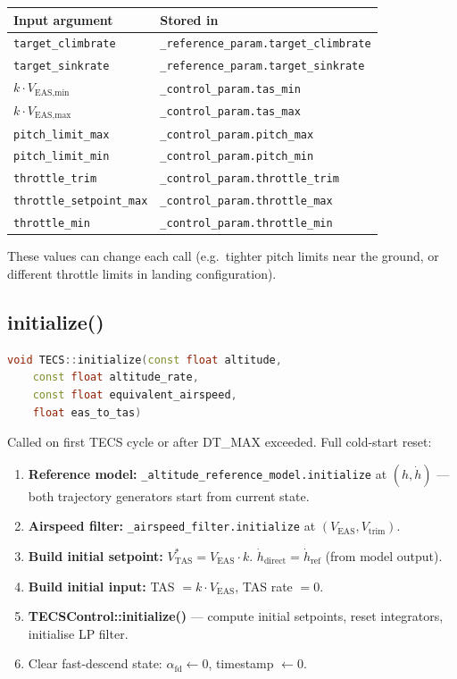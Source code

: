 \documentclass[12pt,a4paper]{article}
\begin{document}
\begin{center}
\begin{tabular}{ll}
\toprule
Input argument & Stored in \\
\midrule
\texttt{target\_climbrate} & \texttt{\_reference\_param.target\_climbrate} \\
\texttt{target\_sinkrate}  & \texttt{\_reference\_param.target\_sinkrate} \\
$k \cdot V_{\text{EAS,min}}$ & \texttt{\_control\_param.tas\_min} \\
$k \cdot V_{\text{EAS,max}}$ & \texttt{\_control\_param.tas\_max} \\
\texttt{pitch\_limit\_max} & \texttt{\_control\_param.pitch\_max} \\
\texttt{pitch\_limit\_min} & \texttt{\_control\_param.pitch\_min} \\
\texttt{throttle\_trim}    & \texttt{\_control\_param.throttle\_trim} \\
\texttt{throttle\_setpoint\_max} & \texttt{\_control\_param.throttle\_max} \\
\texttt{throttle\_min}     & \texttt{\_control\_param.throttle\_min} \\
\bottomrule
\end{tabular}
\end{center}

These values can change each call (e.g.\ tighter pitch limits near the
ground, or different throttle limits in landing configuration).

\subsection{initialize()}

\begin{lstlisting}[language=C++]
void TECS::initialize(const float altitude,
    const float altitude_rate,
    const float equivalent_airspeed,
    float eas_to_tas)
\end{lstlisting}

Called on first TECS cycle or after DT\_MAX exceeded. Full cold-start reset:

\begin{enumerate}
  \item \textbf{Reference model:} \texttt{\_altitude\_reference\_model.initialize}
        at $(h, \dot{h})$ --- both trajectory generators start from current state.
  \item \textbf{Airspeed filter:} \texttt{\_airspeed\_filter.initialize}
        at $(V_{\text{EAS}}, V_{\text{trim}})$.
  \item \textbf{Build initial setpoint:}
        $V^*_{\text{TAS}} = V_{\text{EAS}} \cdot k$.
        $\dot{h}_{\text{direct}} = \dot{h}_{\text{ref}}$ (from model output).
  \item \textbf{Build initial input:}
        TAS $= k \cdot V_{\text{EAS}}$, TAS rate $= 0$.
  \item \textbf{TECSControl::initialize()} --- compute initial setpoints,
        reset integrators, initialise LP filter.
  \item Clear fast-descend state: $\alpha_{\text{fd}} \leftarrow 0$,
        timestamp $\leftarrow 0$.
\end{enumerate}
\end{document}
